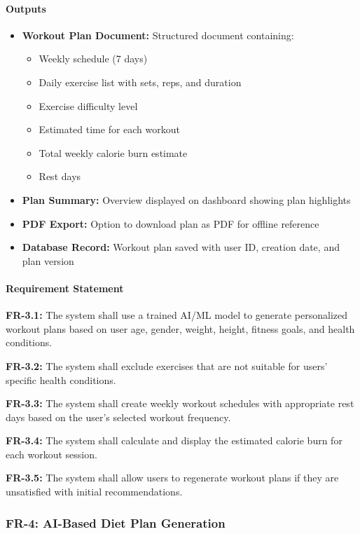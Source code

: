 \documentclass[12pt,a4paper]{article}
\begin{document}
\paragraph{Outputs}
\begin{itemize}
    \item \textbf{Workout Plan Document:} Structured document containing:
    \begin{itemize}
        \item Weekly schedule (7 days)
        \item Daily exercise list with sets, reps, and duration
        \item Exercise difficulty level
        \item Estimated time for each workout
        \item Total weekly calorie burn estimate
        \item Rest days
    \end{itemize}
    \item \textbf{Plan Summary:} Overview displayed on dashboard showing plan highlights
    \item \textbf{PDF Export:} Option to download plan as PDF for offline reference
    \item \textbf{Database Record:} Workout plan saved with user ID, creation date, and plan version
\end{itemize}

\paragraph{Requirement Statement}
\textbf{FR-3.1:} The system shall use a trained AI/ML model to generate personalized workout plans based on user age, gender, weight, height, fitness goals, and health conditions.

\textbf{FR-3.2:} The system shall exclude exercises that are not suitable for users' specific health conditions.

\textbf{FR-3.3:} The system shall create weekly workout schedules with appropriate rest days based on the user's selected workout frequency.

\textbf{FR-3.4:} The system shall calculate and display the estimated calorie burn for each workout session.

\textbf{FR-3.5:} The system shall allow users to regenerate workout plans if they are unsatisfied with initial recommendations.

\subsubsection{FR-4: AI-Based Diet Plan Generation}
\end{document}
